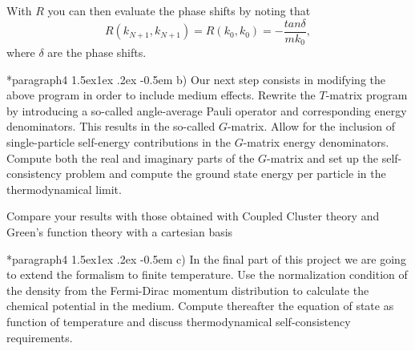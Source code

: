 \documentclass[%
twoside,                 %
final,                   %
10pt]{article}
\makeatletter
\newenvironment{doconceexercise}{}{}
\newcommand\subex{\@startsection*{paragraph}{4}{\z@}%
                  {1.5ex\@plus1ex \@minus.2ex}%
                  {-0.5em}%
                  {\normalfont\normalsize\bfseries}}
\makeatother
\begin{document}
\begin{doconceexercise}
With $R$ you can then evaluate the phase shifts
by noting that 
\[
      R(k_{N+1},k_{N+1})=R(k_0,k_0)=-\frac{tan\delta}{mk_0},
\]
where $\delta$ are the phase shifts.


\subex{b)}
Our next step consists in modifying the above program in order to include medium effects.
Rewrite the $T$-matrix program by introducing a so-called angle-average Pauli operator
and corresponding energy denominators. This results in the so-called $G$-matrix.
Allow for the inclusion of single-particle self-energy contributions in the $G$-matrix energy denominators. Compute both the real and imaginary parts of the $G$-matrix and set up the self-consistency problem and compute the ground state energy per particle in the thermodynamical limit.

Compare your results with those obtained with Coupled Cluster theory
and Green's function theory with a cartesian basis


\subex{c)}
In the final part of this project we are going to extend the formalism to finite temperature.
Use the normalization condition of the density from the Fermi-Dirac momentum distribution 
to calculate the chemical potential in the medium. Compute thereafter the equation of state 
as function of temperature and discuss thermodynamical self-consistency requirements.



\end{doconceexercise}




\printindex
\end{document}

